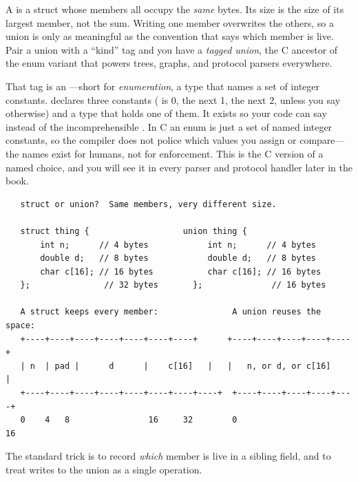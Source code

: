 A  is a struct whose members all occupy the \emph{same}
bytes. Its size is the size of its largest member, not the sum. Writing
one member overwrites the others, so a union is only as meaningful as
the convention that says which member is live. Pair a union with a
``kind'' tag and you have a \emph{tagged union}, the C ancestor of the
enum variant that powers trees, graphs, and protocol parsers everywhere.

That tag is an ---short for \emph{enumeration}, a type that
names a set of integer constants.  declares three constants
( is 0, the next 1, the next 2, unless you say
otherwise) and a type  that holds one of them. It exists so
your code can say  instead of the
incomprehensible . In C an enum is just a set of named
integer constants, so the compiler does not police which values you
assign or compare---the names exist for humans, not for enforcement.
This is the C version of a named choice, and you will see it in every
parser and protocol handler later in the book.

\begin{verbatim}
   struct or union?  Same members, very different size.

   struct thing {                   union thing {
       int n;      // 4 bytes            int n;      // 4 bytes
       double d;   // 8 bytes            double d;   // 8 bytes
       char c[16]; // 16 bytes           char c[16]; // 16 bytes
   };               // 32 bytes       };              // 16 bytes

   A struct keeps every member:               A union reuses the space:
   +----+----+----+----+----+----+----+      +----+----+----+----+----+
   | n  | pad |      d      |    c[16]   |   |   n, or d, or c[16]    |
   +----+----+----+----+----+----+----+----+  +----+----+----+----+----+
   0    4   8                16     32        0                        16
\end{verbatim}

The standard trick is to record \emph{which} member is live in a
sibling field, and to treat writes to the union as a single operation.

